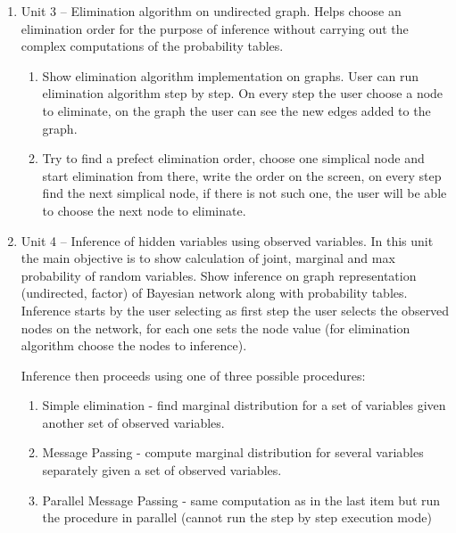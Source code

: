 \documentclass{article}
\newcommand{\comment}[2]{
	\todo[color=GreenYellow,inline]{
		\underline{\textbf{#1:}} #2
	}}
\begin{document}
\begin{enumerate}
        \item Unit 3\label{unit3} -- 
            Elimination algorithm on undirected graph. Helps choose an elimination order for the purpose of inference without carrying out the complex computations of the probability tables.
        \begin{enumerate}
            \item Show elimination algorithm implementation on graphs. User can run elimination algorithm step by step. On every step the user choose a node to eliminate, on the graph the user can see the new edges added to the graph.
            \item Try to find a prefect elimination order, choose one simplical node and start elimination from there, write the order on the screen, on every step find the next simplical node, if there is not such one, the user will be able to choose the next node to eliminate.
        \end{enumerate}
        \item Unit 4 --
            Inference of hidden variables using observed variables. In this unit the main objective is to show calculation of joint, marginal and max probability of random variables. Show inference on graph representation (undirected, factor) of Bayesian network along with probability tables. Inference starts by the user selecting as first step the user selects the observed nodes on the network, for each one sets the node value (for elimination algorithm choose the nodes to inference).

            Inference then proceeds using one of three possible procedures:
            \begin{enumerate}
                \item Simple elimination - find marginal distribution for a set of variables given another set of observed variables.
                \item Message Passing - compute marginal distribution for several variables separately given a set of observed variables.
                \item Parallel Message Passing - same computation as in the last item but run the procedure in parallel (cannot run the step by step execution mode)
            \end{enumerate}


\end{enumerate}
\end{document}
